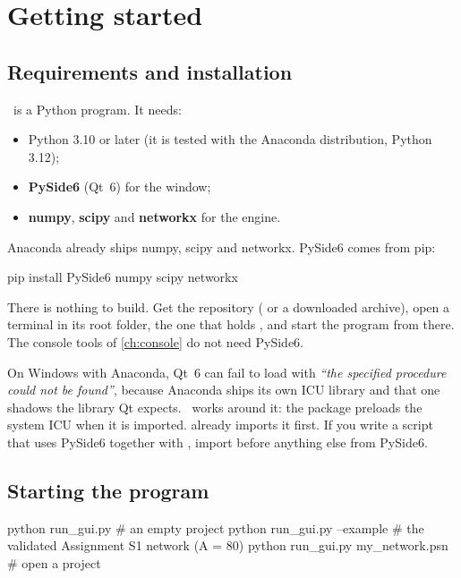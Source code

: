 \chapter{Getting started}\label{ch:getting-started}

\section{Requirements and installation}

\app\ is a Python program. It needs:

\begin{itemize}
  \item Python 3.10 or later (it is tested with the Anaconda distribution, Python 3.12);
  \item \textbf{PySide6} (Qt~6) for the window;
  \item \textbf{numpy}, \textbf{scipy} and \textbf{networkx} for the engine.
\end{itemize}

Anaconda already ships numpy, scipy and networkx. PySide6 comes from pip:

\begin{terminal}
pip install PySide6 numpy scipy networkx
\end{terminal}

There is nothing to build. Get the repository ( or a downloaded archive),
open a terminal in its root folder, the one that holds , and start the
program from there. The console tools of \cref{ch:console} do not need PySide6.

\begin{note}
On Windows with Anaconda, Qt~6 can fail to load with \emph{``the specified procedure
could not be found''}, because Anaconda ships its own ICU library and that one shadows the
library Qt expects. \app\ works around it: the package  preloads the system
ICU when it is imported.  already imports it first. If you write a
script that uses PySide6 together with \app, import  before anything else
from PySide6.
\end{note}

\section{Starting the program}

\begin{terminal}
python run_gui.py                   # an empty project
python run_gui.py --example         # the validated Assignment S1 network (A = 80)
python run_gui.py my_network.psn    # open a project
\end{terminal}

